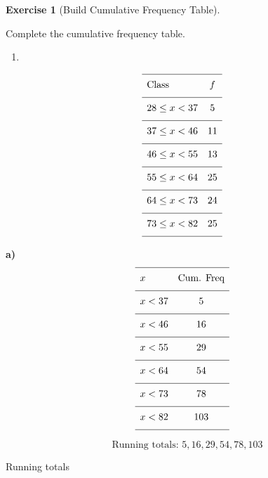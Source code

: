 \documentclass[
  letterpaper,
  DIV=11,
  numbers=noendperiod]{scrreprt}
\providecommand{\tightlist}{%
  \setlength{\itemsep}{0pt}\setlength{\parskip}{0pt}}
\theoremstyle{definition}
\newtheorem{exercise}{Exercise}[chapter]
\theoremstyle{remark}
\begin{document}
\begin{exercise}[Build Cumulative Frequency
Table]\protect\hypertarget{exr-cf-1}{}\label{exr-cf-1}

Complete the cumulative frequency table.

\begin{enumerate}
\def\labelenumi{\alph{enumi})}
\tightlist
\item
\end{enumerate}

\[{\renewcommand{\arraystretch}{1.6}\begin{array}{lc}
\hline \text{Class} & f \\[4pt]
\hline 28 \leq x < 37 & 5 \\[4pt]
\hline 37 \leq x < 46 & 11 \\[4pt]
\hline 46 \leq x < 55 & 13 \\[4pt]
\hline 55 \leq x < 64 & 25 \\[4pt]
\hline 64 \leq x < 73 & 24 \\[4pt]
\hline 73 \leq x < 82 & 25 \\[4pt]
\hline
\end{array}}\]

\begin{tcolorbox}[enhanced jigsaw, opacitybacktitle=0.6, coltitle=black, arc=.35mm, colframe=quarto-callout-tip-color-frame, colback=white, bottomrule=.15mm, left=2mm, colbacktitle=quarto-callout-tip-color!10!white, titlerule=0mm, opacityback=0, title=\textcolor{quarto-callout-tip-color}{\faLightbulb}\hspace{0.5em}{🔍 View Solution}, leftrule=.75mm, breakable, rightrule=.15mm, bottomtitle=1mm, toptitle=1mm, toprule=.15mm]

\textbf{a)} \[\begin{array}{lc}
\hline x & \text{Cum. Freq} \\[4pt]
\hline x < 37 & 5 \\[4pt]
\hline x < 46 & 16 \\[4pt]
\hline x < 55 & 29 \\[4pt]
\hline x < 64 & 54 \\[4pt]
\hline x < 73 & 78 \\[4pt]
\hline x < 82 & 103 \\[4pt]
\hline
\end{array}\]

\[\quad \text{Running totals: }5, 16, 29, 54, 78, 103\]

\end{tcolorbox}

{Running totals}

\end{exercise}
\end{document}
